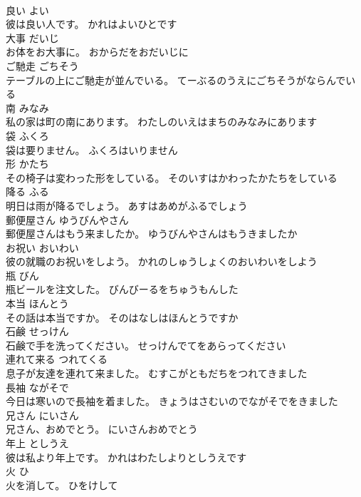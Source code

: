\documentclass[8pt]{extreport}
\begin{document}
\begin{CJK}{UTF8}{min}
\\	良い	よい	
\\	彼は良い人です。	かれはよいひとです	
\\	大事	だいじ	
\\	お体をお大事に。	おからだをおだいじに	
\\	ご馳走	ごちそう	
\\	テーブルの上にご馳走が並んでいる。	てーぶるのうえにごちそうがならんでいる	
\\	南	みなみ	
\\	私の家は町の南にあります。	わたしのいえはまちのみなみにあります	
\\	袋	ふくろ	
\\	袋は要りません。	ふくろはいりません	
\\	形	かたち	
\\	その椅子は変わった形をしている。	そのいすはかわったかたちをしている	
\\	降る	ふる	
\\	明日は雨が降るでしょう。	あすはあめがふるでしょう	
\\	郵便屋さん	ゆうびんやさん	
\\	郵便屋さんはもう来ましたか。	ゆうびんやさんはもうきましたか	
\\	お祝い	おいわい	
\\	彼の就職のお祝いをしよう。	かれのしゅうしょくのおいわいをしよう	
\\	瓶	びん	
\\	瓶ビールを注文した。	びんびーるをちゅうもんした	
\\	本当	ほんとう	
\\	その話は本当ですか。	そのはなしはほんとうですか	
\\	石鹸	せっけん	
\\	石鹸で手を洗ってください。	せっけんでてをあらってください	
\\	連れて来る	つれてくる	
\\	息子が友達を連れて来ました。	むすこがともだちをつれてきました	
\\	長袖	ながそで	
\\	今日は寒いので長袖を着ました。	きょうはさむいのでながそでをきました	
\\	兄さん	にいさん	
\\	兄さん、おめでとう。	にいさんおめでとう	
\\	年上	としうえ	
\\	彼は私より年上です。	かれはわたしよりとしうえです	
\\	火	ひ	
\\	火を消して。	ひをけして	

\end{CJK}
\end{document}
